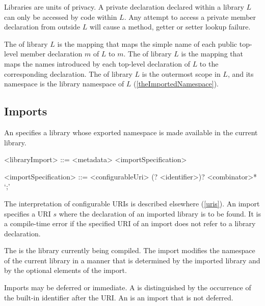 \documentclass[makeidx]{article}
\begin{document}
{\LMHash{}%
Libraries are units of privacy.
A private declaration declared within a library $L$ can only be accessed by code within $L$.
Any attempt to access a private member declaration from outside $L$ will cause a method, getter or setter lookup failure.


\LMHash{}%
The  of library $L$ is the mapping that maps
the simple name of each public top-level member declaration $m$ of $L$ to $m$.
The  of library $L$ is the mapping that maps
the names introduced by each top-level declaration of $L$
to the corresponding declaration.
The  of library $L$ is the outermost scope in $L$,
and its namespace is the library namespace of $L$
(\ref{theImportedNamespace}).


\subsection{Imports}

\LMHash{}%
An  specifies a library whose exported namespace
is made available in the current library.

\begin{grammar}
<libraryImport> ::= <metadata> <importSpecification>

<importSpecification> ::= \gnewline{}
  \IMPORT{} <configurableUri> (\DEFERRED? \AS{} <identifier>)? <combinator>* `;'
\end{grammar}

\LMHash{}%
The interpretation of configurable URIs is described elsewhere
(\ref{uris}).
An import specifies a URI $s$
where the declaration of an imported library is to be found.
It is a compile-time error if the specified URI of an import
does not refer to a library declaration.

\LMHash{}%
The  is the library currently being compiled.
The import modifies the namespace of the current library
in a manner that is determined by the imported library and
by the optional elements of the import.

\LMHash{}%
Imports may be deferred or immediate.
A
is distinguished by the occurrence of
the built-in identifier \DEFERRED{} after the URI.
An
is an import that is not deferred.

}
\end{document}
